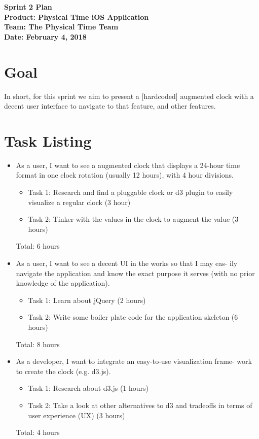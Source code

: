 \documentclass[11pt]{article}
\newcommand\tab[1][1cm]{\hspace*{#1}}
\begin{document}
	\Large{\textbf{Sprint 2 Plan}}\\
	\Large{\textbf{Product: Physical Time iOS Application}}\\
	\Large{\textbf{Team: The Physical Time Team}}\\
	\Large{\textbf{Date: February 4, 2018}}\\
	
	\vspace{-3mm}
	
	\section{Goal}
		\vspace{-3mm}
		\tab \normalsize{In short, for this sprint we aim to present a [hardcoded] augmented clock with a decent user interface to navigate to that feature, and other features.}
	\section{Task Listing}
		\vspace{-3mm}
		\begin{itemize}
			\item As a user, I want to see a augmented clock that displays a 24-hour time format in one clock rotation (usually 12 hours), with 4 hour divisions.
			\begin{itemize}
			    \item Task 1: Research and find a pluggable clock or d3 plugin to easily visualize a regular clock (3 hour)
			    \item Task 2: Tinker with the values in the clock to augment the value (3 hours)
			\end{itemize}
			Total: 6 hours
			\item  As a user, I want to see a decent UI in the works so that I may eas- ily navigate the application and know the exact purpose it serves (with no prior knowledge of the application).
			\begin{itemize}
			    \item Task 1: Learn about jQuery (2 hours)
			    \item Task 2: Write some boiler plate code for the application skeleton (6 hours)
			\end{itemize}
			Total: 8 hours
			\item As a developer, I want to integrate an easy-to-use visualization frame- work to create the clock (e.g. d3.js).
			\begin{itemize}
			    \item Task 1: Research about d3.js (1 hours)
			    \item Task 2: Take a look at other alternatives to d3 and tradeoffs in terms of user experience (UX) (3 hours)
			\end{itemize}
			 Total: 4 hours
		\end{itemize}
		
\end{document}

